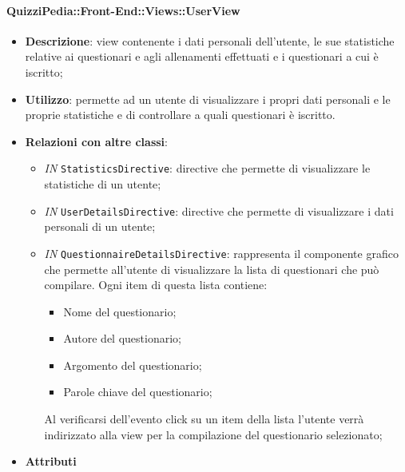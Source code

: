 \paragraph{QuizziPedia::Front-End::Views::UserView}
\begin{itemize}
	\item \textbf{Descrizione}: view contenente i dati personali dell'utente, le sue statistiche relative ai questionari e agli allenamenti effettuati e i questionari a cui è iscritto;
	\item \textbf{Utilizzo}:  permette ad un utente di visualizzare i propri dati personali e le proprie statistiche e di controllare a quali questionari è iscritto. 
	\item \textbf{Relazioni con altre classi}:
	\begin{itemize}
		\item \textit{IN} \texttt{StatisticsDirective}: directive che permette di visualizzare le statistiche di un utente;
		\item \textit{IN} \texttt{UserDetailsDirective}: directive che permette di visualizzare i dati personali di un utente;
		\item \textit{IN} \texttt{QuestionnaireDetailsDirective}: rappresenta il componente grafico che permette all'utente di visualizzare la lista di questionari che può compilare. Ogni item di questa lista contiene:
		\begin{itemize}
			\item Nome del questionario;
			\item Autore del questionario;
			\item Argomento del questionario;
			\item Parole chiave del questionario;
		\end{itemize}
		Al verificarsi dell'evento click su un item della lista l'utente verrà indirizzato alla view per
		la compilazione del questionario selezionato;
	\end{itemize}
	\item \textbf{Attributi}
\end{itemize}

